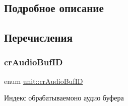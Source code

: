 \subsection{Подробное описание}


\subsection{Перечисления}
\mbox{\label{group___xD0_x9F_xD0_xB5_xD1_x80_xD0_xB5_xD1_x87_xD0_xB8_xD1_x81_xD0_xBB_xD0_xB5_xD0_xBD_xD0_xB8_xD1_x8F_ga30dd689bff585403e080598b50585936}} 
\subsubsection{\texorpdfstring{cr\+Audio\+Buf\+ID}{crAudioBufID}}
{\footnotesize\ttfamily enum \hyperlink{group___xD0_x9F_xD0_xB5_xD1_x80_xD0_xB5_xD1_x87_xD0_xB8_xD1_x81_xD0_xBB_xD0_xB5_xD0_xBD_xD0_xB8_xD1_x8F_ga30dd689bff585403e080598b50585936}{unit\+::cr\+Audio\+Buf\+ID}}



Индекс обрабатываемоно аудио буфера 

